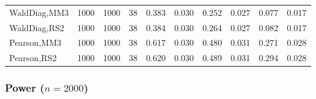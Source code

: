 \documentclass[
]{article}
\begin{document}
\begin{table}[H]
{\begin{tabular}[t]{lrrrrrrlrr}
\hspace{1em}WaldDiag,MM3 & 1000 & 1000 & 38 & 0.383 & 0.030 & 0.252 & 0.027 & 0.077 & 0.017\\
\hspace{1em}WaldDiag,RS2 & 1000 & 1000 & 38 & 0.384 & 0.030 & 0.264 & 0.027 & 0.082 & 0.017\\
\hspace{1em}Pearson,MM3 & 1000 & 1000 & 38 & 0.617 & 0.030 & 0.480 & 0.031 & 0.271 & 0.028\\
\hspace{1em}Pearson,RS2 & 1000 & 1000 & 38 & 0.620 & 0.030 & 0.489 & 0.031 & 0.294 & 0.028\\
\bottomrule
\end{tabular}}
\endgroup{}
\end{table}

\hypertarget{power-n2000-3}{%
\subsubsection{\texorpdfstring{Power
(\(n=2000\))}{Power (n=2000)}}\label{power-n2000-3}}
\end{document}
